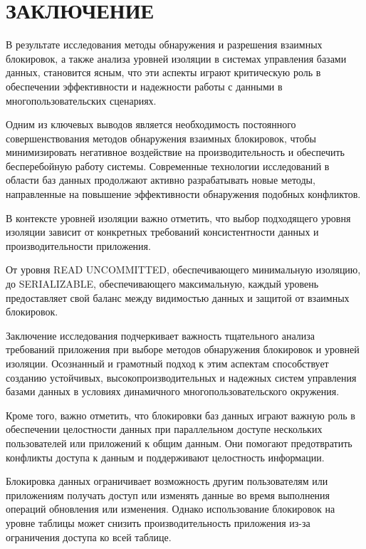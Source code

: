 \chapter*{\hfill{\centering ЗАКЛЮЧЕНИЕ}\hfill}

В результате исследования методы обнаружения и разрешения взаимных блокировок, а также анализа уровней изоляции в системах управления базами данных, становится ясным, что эти аспекты играют критическую роль в обеспечении эффективности и надежности работы с данными в многопользовательских сценариях.

Одним из ключевых выводов является необходимость постоянного совершенствования методов обнаружения взаимных блокировок, чтобы минимизировать негативное воздействие на производительность и обеспечить бесперебойную работу системы. 
Современные технологии исследований в области баз данных продолжают активно разрабатывать новые методы, направленные на повышение эффективности обнаружения подобных конфликтов.

В контексте уровней изоляции важно отметить, что выбор подходящего уровня изоляции зависит от конкретных требований консистентности данных и производительности приложения. 

От уровня READ UNCOMMITTED, обеспечивающего минимальную изоляцию, до SERIALIZABLE, обеспечивающего максимальную, каждый уровень предоставляет свой баланс между видимостью данных и защитой от взаимных блокировок.

Заключение исследования подчеркивает важность тщательного анализа требований приложения при выборе методов обнаружения блокировок и уровней изоляции. 
Осознанный и грамотный подход к этим аспектам способствует созданию устойчивых, высокопроизводительных и надежных систем управления базами данных в условиях динамичного многопользовательского окружения.

Кроме того, важно отметить, что блокировки баз данных играют важную роль в обеспечении целостности данных при параллельном доступе нескольких пользователей или приложений к общим данным.
Они помогают предотвратить конфликты доступа к данным и поддерживают целостность информации.

Блокировка данных ограничивает возможность другим пользователям или приложениям получать доступ или изменять данные во время выполнения операций обновления или изменения.
Однако использование блокировок на уровне таблицы может снизить производительность приложения из-за ограничения доступа ко всей таблице.

